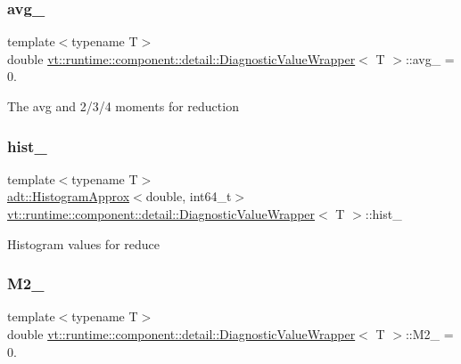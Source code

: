 \subsubsection{\texorpdfstring{avg\+\_\+}{avg\_}}
{\footnotesize\ttfamily template$<$typename T$>$ \\
double \hyperlink{structvt_1_1runtime_1_1component_1_1detail_1_1_diagnostic_value_wrapper}{vt\+::runtime\+::component\+::detail\+::\+Diagnostic\+Value\+Wrapper}$<$ T $>$\+::avg\+\_\+ = 0.\hspace{0.3cm}{\ttfamily [private]}}

The avg and 2/3/4 moments for reduction \mbox{\label{structvt_1_1runtime_1_1component_1_1detail_1_1_diagnostic_value_wrapper_af507930d714b3665233a19ef93fc6d32}} 
\subsubsection{\texorpdfstring{hist\+\_\+}{hist\_}}
{\footnotesize\ttfamily template$<$typename T$>$ \\
\hyperlink{namespacevt_1_1adt_a486971e142bc22434d6afe695c43b599}{adt\+::\+Histogram\+Approx}$<$double, int64\+\_\+t$>$ \hyperlink{structvt_1_1runtime_1_1component_1_1detail_1_1_diagnostic_value_wrapper}{vt\+::runtime\+::component\+::detail\+::\+Diagnostic\+Value\+Wrapper}$<$ T $>$\+::hist\+\_\+\hspace{0.3cm}{\ttfamily [private]}}

Histogram values for reduce \mbox{\label{structvt_1_1runtime_1_1component_1_1detail_1_1_diagnostic_value_wrapper_af76d6679a75ff42618eabd6ae844e18e}} 
\subsubsection{\texorpdfstring{M2\+\_\+}{M2\_}}
{\footnotesize\ttfamily template$<$typename T$>$ \\
double \hyperlink{structvt_1_1runtime_1_1component_1_1detail_1_1_diagnostic_value_wrapper}{vt\+::runtime\+::component\+::detail\+::\+Diagnostic\+Value\+Wrapper}$<$ T $>$\+::M2\+\_\+ = 0.\hspace{0.3cm}{\ttfamily [private]}}

